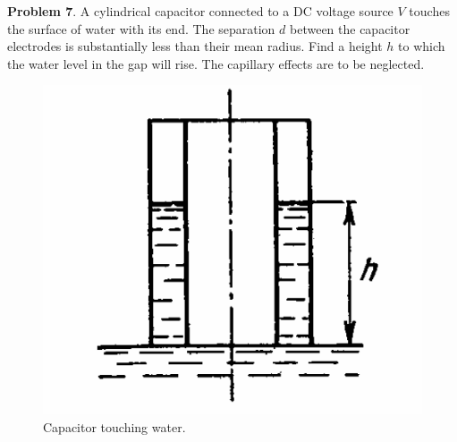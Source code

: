 \documentclass[11pt, letterpaper]{article}
\begin{document}
\textbf{Problem 7}. A cylindrical capacitor connected to a DC voltage source $V$ touches the surface of water with its end. The separation $d$ between the capacitor electrodes is substantially less than their mean radius. Find a height $h$ to which the water level in the gap
will rise. The capillary effects are to be neglected.
\begin{figure}[h!]
	\centering
	\includegraphics[scale=0.45]{p4}
	\caption{Capacitor touching water.}
	\label{fig:p4}
\end{figure}
\end{document}
